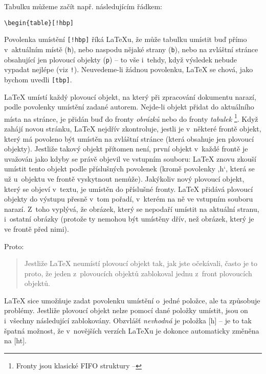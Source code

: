 Tabulku můžeme začít např. následujícím řádkem:
\begin{code}
\verb|\begin{table}[!hbp]|
\end{code}
\noindent {}Povolenka umístění \verb|[!hbp]| říká \LaTeX u, že může
tabulku umístit buď přímo v~aktuálním místě (\texttt{h}), nebo naspodu nějaké
strany (\texttt{b}), nebo na zvláštní stránce obsahující jen plovoucí objekty
(\texttt{p}) -- to vše i~tehdy, když výsledek nebude vypadat nejlépe (viz \texttt{!}).
Neuvedeme-li žádnou povolenku, \LaTeX{} se chová, jako bychom uvedli \verb|[tbp]|.

\LaTeX{} umístí každý plovoucí objekt, na který při
zpracování dokumentu narazí, podle povolenky umístění zadané autorem.
Nejde-li objekt přidat do aktuálního místa na stránce, je 
přidán buď do fronty \emph{obrázků} nebo do fronty \emph{tabulek}%
\footnote{Fronty jsou klasické FIFO struktury -- }. Když zahájí novou stránku, \LaTeX{} nejdřív zkontroluje,
jestli je v~některé frontě  objekt, který má povoleno
být umístěn na zvláštní stránce (která obsahuje jen plovoucí objekty).
Jestliže takový objekt přítomen není, první objekt v~každé frontě
je uvažován jako kdyby se právě objevil ve vstupním souboru: \LaTeX{}
znovu zkouší umístit tento objekt podle příslušných povolenek
(kromě povolenky ,h`, která se už u~objektu ve frontě vyskytnout nemůže).
Jakýkoliv nový plovoucí objekt, který se objeví v~textu, je umístěn
do příslušné fronty. \LaTeX{} přidává plovoucí objekty do výstupu
přesně v~tom pořadí, v~kterém na ně ve vstupním
souboru narazí. Z~toho vyplývá, že obrázek, který se nepodaří umístit
na aktuální stranu,  i~ostatní obrázky (protože ty nemohou být
umístěny dřív, než obrázek, který je ve frontě před nimi).

Proto:

\begin{quote}
Jestliže \LaTeX{} neumístí plovoucí objekt tak, jak jste očekávali,
často je to proto, že jeden z~plovoucích objektů zablokoval
jednu z~front plovoucích objektů.
\end{quote}                 

\LaTeX{} sice umožňuje zadat povolenku umístění o~jedné položce, ale
ta způsobuje problémy. Jestliže plovoucí objekt nelze pomocí dané
položky umístit, jsou on i~všechny následující zablokovány.
Obzvlášť \emph{nevhodná} je položka [h] -- je to tak špatná možnost,
že v~novějších verzích \LaTeX u je dokonce automaticky změněna na [ht].

